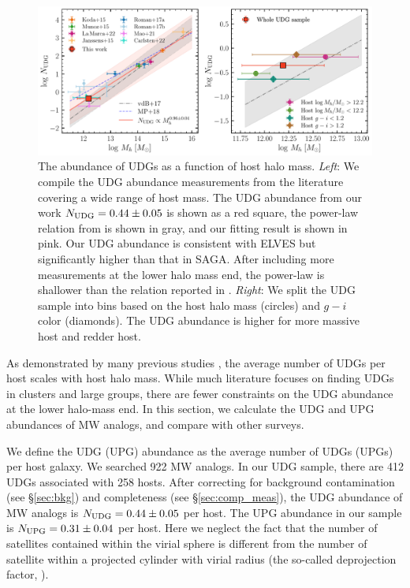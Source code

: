 \documentclass[twocolumn,astrosymb,twocolappendix,linenumbers]{aastex631}
\begin{document}
\begin{CJK*}{UTF8}{gbsn}
\begin{figure}
	\vbox{ 
		\centering
		\includegraphics[width=1\linewidth]{N_UDG_host_mass.pdf}
	}
    \caption{The abundance of UDGs as a function of host halo mass. \textit{Left}: We compile the UDG abundance measurements from the literature covering a wide range of host mass. The UDG abundance from our work $N_{\rm UDG} = 0.44\pm 0.05$ is shown as a red square, the power-law relation from \citet{vdBurg2017} is shown in gray, and our fitting result is shown in pink. Our UDG abundance is consistent with ELVES but significantly higher than that in SAGA. After including more measurements at the lower halo mass end, the power-law is shallower than the relation reported in \citet{vdBurg2017}. \textit{Right}: We split the UDG sample into bins based on the host halo mass (circles) and $g-i$ color (diamonds). The UDG abundance is higher for more massive host and redder host. }
    \label{fig:n_udg}
\end{figure}

As demonstrated by many previous studies \citep[e.g.,][]{vdBurg2016,vdBurg2017,Roman2017a,Karunakaran2022b}, the average number of UDGs per host scales with host halo mass. While much literature focuses on finding UDGs in clusters and large groups, there are fewer constraints on the UDG abundance at the lower halo-mass end. In this section, we calculate the UDG and UPG abundances of MW analogs, and compare with other surveys.

We define the UDG (UPG) abundance as the average number of UDGs (UPGs) per host galaxy. We searched 922 MW analogs. In our UDG sample, there are 412 UDGs associated with 258 hosts. After correcting for background contamination (see \S \ref{sec:bkg}) and completeness (see \S \ref{sec:comp_meas}), the UDG abundance of MW analogs is $N_{\rm UDG} = 0.44\pm 0.05$ per host. The UPG abundance in our sample is $N_{\rm UPG} = 0.31\pm 0.04$ per host. Here we neglect the fact that the number of satellites contained within the virial sphere is different from the number of satellite within a projected cylinder with virial radius (the so-called deprojection factor, \citealt{vdBurg2017}).



\end{CJK*}
\end{document}
